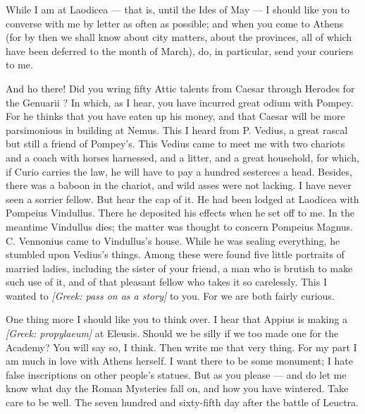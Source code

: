  While I am at Laodicea --- that is, until the Ides of May --- I should like you to converse with me by letter as often as possible; and when you come to Athens (for by then we shall know about city matters, about the provinces, all of which have been deferred to the month of March), do, in particular, send your couriers to me.

 And ho there! Did you wring fifty Attic talents from Caesar through Herodes for the \dag Genuarii \dag? In which, as I hear, you have incurred great odium with Pompey. For he thinks that you have eaten up his money, and that Caesar will be more parsimonious in building at Nemus. This I heard from P. Vedius, a great rascal but still a friend of Pompey's. This Vedius came to meet me with two chariots and a coach with horses harnessed, and a litter, and a great household, for which, if Curio carries the law, he will have to pay a hundred sesterces a head. Besides, there was a baboon in the chariot, and wild asses were not lacking. I have never seen a sorrier fellow. But hear the cap of it. He had been lodged at Laodicea with Pompeius Vindullus. There he deposited his effects when he set off to me. In the meantime Vindullus dies; the matter was thought to concern Pompeius Magnus. C. Vennonius came to Vindullus's house. While he was sealing everything, he stumbled upon Vedius's things. Among these were found five little portraits of married ladies, including the sister of your friend, a man who is brutish to make such use of it, and of that pleasant fellow who takes it so carelessly. This I wanted to \textit{[Greek: pass on as a story]} to you. For we are both fairly curious.

 One thing more I should like you to think over. I hear that Appius is making a \textit{[Greek: propylaeum]} at Eleusis. Should we be silly if we too made one for the Academy? You will say so, I think. Then write me that very thing. For my part I am much in love with Athens herself. I want there to be some monument; I hate false inscriptions on other people's statues. But as you please --- and do let me know what day the Roman Mysteries fall on, and how you have wintered. Take care to be well. The seven hundred and sixty-fifth day after the battle of Leuctra.
